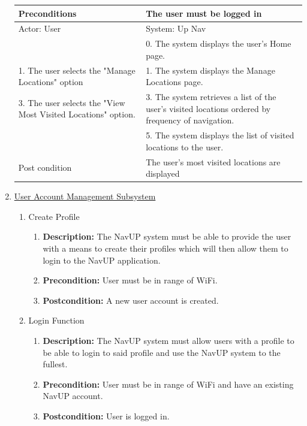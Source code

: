 \documentclass{article}
\begin{document}
\begin{enumerate}
		\begin{tabular}{ | m{15em} | m{15em}| }
		\hline
		Preconditions                                                  											& The user must be logged in \\ 
		\hline
		Actor: User                                                  											& System: Up Nav \\ 
		\hline
                                                              														& 0. The system displays the user's Home page. \\ 
		\hline
		1. The user selects the "Manage Locations" option										& 1. The system displays the Manage Locations page. \\
		\hline
		3. The user selects the "View Most Visited Locations" option. 								& 3. The system retrieves a list of the user's visited locations ordered by frequency of navigation. \\ 
		\hline
                                                              														& 5. The system displays the list of visited locations to the user. \\ 
		\hline
		Post condition                                                											& The user's most visited locations are displayed \\ 
		\hline
	\end{tabular}

	
	\item \underline{User Account Management Subsystem}
	\begin{enumerate}
		\item Create Profile
		\begin{enumerate}
			\item \textbf{Description:} The NavUP system must be able to provide the user with a means to create their profiles which will then allow them to login to the NavUP application. 
			\item \textbf{Precondition:} User must be in range of WiFi.
			\item \textbf{Postcondition:} A new user account is created.\newline
		\end{enumerate}
		
		\item Login Function
		\begin{enumerate}
			\item \textbf{Description:} The NavUP system must allow users with a profile to be able to login to said profile and use the NavUP system to the fullest. 
			\item \textbf{Precondition:} User must be in range of WiFi and have an existing NavUP account.
			\item \textbf{Postcondition:} User is logged in.\newline
		\end{enumerate}
		

\end{enumerate}
\end{enumerate}
\end{document}
